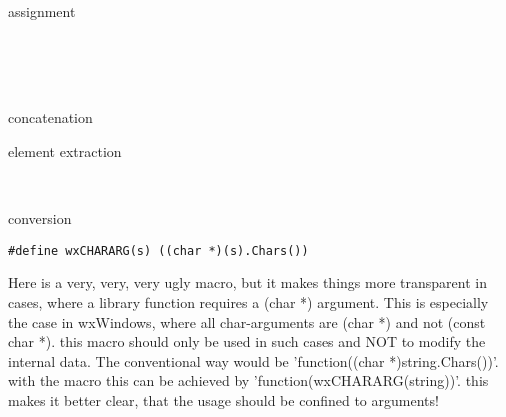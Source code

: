 assignment
 
\label{wxstringPlusEqual}
\\
\\
\\

concatenation

\label{wxstringoperatorbracket}

element extraction

\label{wxstringoperatorparenth}

\label{wxstringoperatorout}
\\

\label{wxstringoperatorin}

\label{wxstringoperatorconstcharpt}
 

conversion

\label{wxstringwxCHARARG}
\begin{verbatim}
#define wxCHARARG(s) ((char *)(s).Chars())  
\end{verbatim}

Here is a very, very, very ugly macro, but it makes things more
transparent in cases, where a library function requires a 
(char *) argument. This is especially the case in wxWindows,
where all char-arguments are (char *) and not (const char *).
this macro should only be used in such cases and NOT to
modify the internal data.
The conventional way would be 'function((char *)string.Chars())'.
with the macro this can be achieved by 'function(wxCHARARG(string))'.
this makes it better clear, that the usage should be confined
to arguments!

\label{wxstringCommonPrefix}
\\

